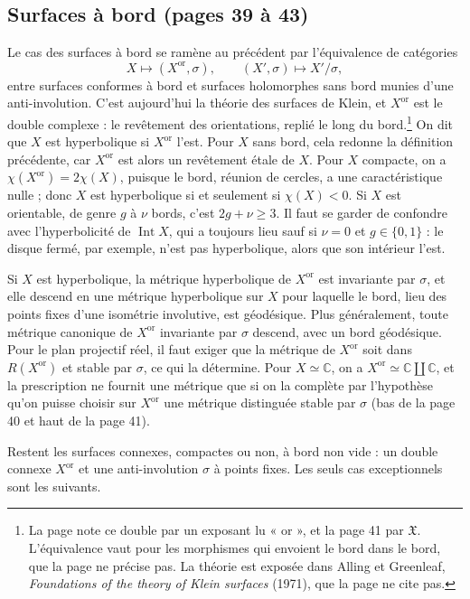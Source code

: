 \documentclass[11pt,a4paper]{article}
\begin{document}
\subsection*{Surfaces à bord (pages 39 à 43)}

Le cas des surfaces à bord se ramène au précédent par l'équivalence de
catégories
\[
X \longmapsto (X^{\mathrm{or}}, \sigma), \qquad
(X', \sigma) \longmapsto X'/\sigma,
\]
entre surfaces conformes à bord et surfaces holomorphes sans bord munies d'une
anti-involution. C'est aujourd'hui la théorie des surfaces de Klein, et
$X^{\mathrm{or}}$ est le double complexe : le revêtement des orientations,
replié le long du bord.\footnote{La page note ce double par un exposant lu
« or », et la page 41 par $\mathfrak{X}$. L'équivalence vaut pour les
morphismes qui envoient le bord dans le bord, que la page ne précise pas. La
théorie est exposée dans Alling et Greenleaf, \emph{Foundations of the theory
of Klein surfaces} (1971), que la page ne cite pas.} On dit que $X$ est
hyperbolique si $X^{\mathrm{or}}$ l'est. Pour $X$ sans bord, cela redonne la
définition précédente, car $X^{\mathrm{or}}$ est alors un revêtement étale de
$X$. Pour $X$ compacte, on a $\chi(X^{\mathrm{or}}) = 2\chi(X)$, puisque le
bord, réunion de cercles, a une caractéristique nulle ; donc $X$ est
hyperbolique si et seulement si $\chi(X) < 0$. Si $X$ est orientable, de genre
$g$ à $\nu$ bords, c'est $2g + \nu \geqslant 3$. Il faut se garder de
confondre avec l'hyperbolicité de $\operatorname{Int} X$, qui a toujours lieu
sauf si $\nu = 0$ et $g \in \{0,1\}$ : le disque fermé, par exemple, n'est pas
hyperbolique, alors que son intérieur l'est.

Si $X$ est hyperbolique, la métrique hyperbolique de $X^{\mathrm{or}}$ est
invariante par $\sigma$, et elle descend en une métrique hyperbolique sur $X$
pour laquelle le bord, lieu des points fixes d'une isométrie involutive, est
géodésique. Plus généralement, toute métrique canonique de $X^{\mathrm{or}}$
invariante par $\sigma$ descend, avec un bord géodésique. Pour le plan
projectif réel, il faut exiger que la métrique de $X^{\mathrm{or}}$ soit dans
$R(X^{\mathrm{or}})$ et stable par $\sigma$, ce qui la détermine. Pour $X
\simeq \mathbb{C}$, on a $X^{\mathrm{or}} \simeq \mathbb{C} \amalg
\mathbb{C}$, et la prescription ne fournit une métrique que si on la complète
par l'hypothèse qu'on puisse choisir sur $X^{\mathrm{or}}$ une métrique
distinguée stable par $\sigma$ (bas de la page 40 et haut de la page 41).

Restent les surfaces connexes, compactes ou non, à bord non vide : un double
connexe $X^{\mathrm{or}}$ et une anti-involution $\sigma$ à points fixes. Les
seuls cas exceptionnels sont les suivants.
\end{document}
